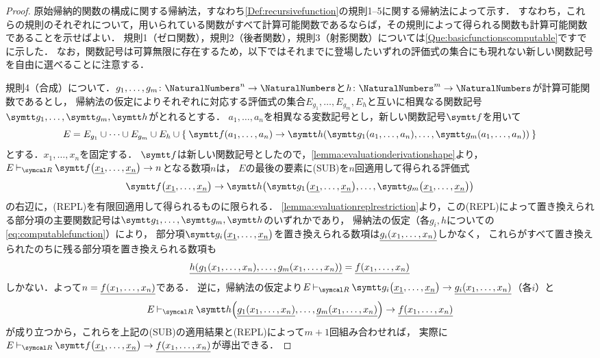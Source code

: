 \begin{proof}
	原始帰納的関数の構成に関する帰納法，すなわち\cref{Def:recursivefunction}の規則1--5に関する帰納法によって示す．
	すなわち，これらの規則のそれぞれについて，用いられている関数がすべて計算可能関数であるならば，その規則によって得られる関数も計算可能関数であることを示せばよい．
	規則1（ゼロ関数），規則2（後者関数），規則3（射影関数）については\cref{Que:basicfunctionscomputable}ですでに示した．
	なお，関数記号は可算無限に存在するため，以下ではそれまでに登場したいずれの評価式の集合にも現れない新しい関数記号を自由に選べることに注意する．

	規則4（合成）について．\(g_1, \dots, g_m \colon \NaturalNumbers^n \to \NaturalNumbers\)と\(h \colon \NaturalNumbers^m \to \NaturalNumbers\)が計算可能関数であるとし，
	帰納法の仮定によりそれぞれに対応する評価式の集合\(E_{g_1}, \dots, E_{g_m}, E_h\)と互いに相異なる関数記号\(\obj{g_1}, \dots, \obj{g_m}, \obj{h}\)がとれるとする．
	\(a_1, \dots, a_n\)を相異なる変数記号とし，新しい関数記号\(\obj{f}\)を用いて
	\[
		E = E_{g_1} \cup \dots \cup E_{g_m} \cup E_h \cup
		\Set{\apply{\obj{f}}{a_1, \dots, a_n} \evaluate \apply{\obj{h}}{\apply{\obj{g_1}}{a_1, \dots, a_n}, \dots, \apply{\obj{g_m}}{a_1, \dots, a_n}}}
	\]
	とする．\(x_1, \dots, x_n\)を固定する．
	\(\obj{f}\)は新しい関数記号としたので，\cref{lemma:evaluationderivationshape}より，
	\(E \evaluatable \apply{\obj{f}}{\numeral{x_1}, \dots, \numeral{x_n}} \evaluate n\)となる数項\(n\)は，
	\(E\)の最後の要素に(SUB)を\(n\)回適用して得られる評価式
	\[
		\apply{\obj{f}}{\numeral{x_1}, \dots, \numeral{x_n}} \evaluate
		\apply{\obj{h}}{\apply{\obj{g_1}}{\numeral{x_1}, \dots, \numeral{x_n}}, \dots, \apply{\obj{g_m}}{\numeral{x_1}, \dots, \numeral{x_n}}}
	\]
	の右辺に，(REPL)を有限回適用して得られるものに限られる．
	\cref{lemma:evaluationreplrestriction}より，この(REPL)によって置き換えられる部分項の主要関数記号は\(\obj{g_1}, \dots, \obj{g_m}, \obj{h}\)のいずれかであり，
	帰納法の仮定（各\(g_i, h\)についての\cref{eq:computablefunction}）により，
	部分項\(\apply{\obj{g_i}}{\numeral{x_1}, \dots, \numeral{x_n}}\)を置き換えられる数項は\(\numeral{\apply{g_i}{x_1, \dots, x_n}}\)しかなく，
	これらがすべて置き換えられたのちに残る部分項を置き換えられる数項も
	\[
		\numeral{\apply{h}{\apply{g_1}{x_1, \dots, x_n}, \dots, \apply{g_m}{x_1, \dots, x_n}}} = \numeral{\apply{f}{x_1, \dots, x_n}}
	\]
	しかない．よって\(n = \numeral{\apply{f}{x_1, \dots, x_n}}\)である．
	逆に，帰納法の仮定より\(E \evaluatable \apply{\obj{g_i}}{\numeral{x_1}, \dots, \numeral{x_n}} \evaluate \numeral{\apply{g_i}{x_1, \dots, x_n}}\)（各\(i\)）と
	\[
		E \evaluatable \apply{\obj{h}}{\numeral{\apply{g_1}{x_1, \dots, x_n}}, \dots, \numeral{\apply{g_m}{x_1, \dots, x_n}}} \evaluate \numeral{\apply{f}{x_1, \dots, x_n}}
	\]
	が成り立つから，これらを上記の(SUB)の適用結果と(REPL)によって\(m + 1\)回組み合わせれば，
	実際に\(E \evaluatable \apply{\obj{f}}{\numeral{x_1}, \dots, \numeral{x_n}} \evaluate \numeral{\apply{f}{x_1, \dots, x_n}}\)が導出できる．


\end{proof}

